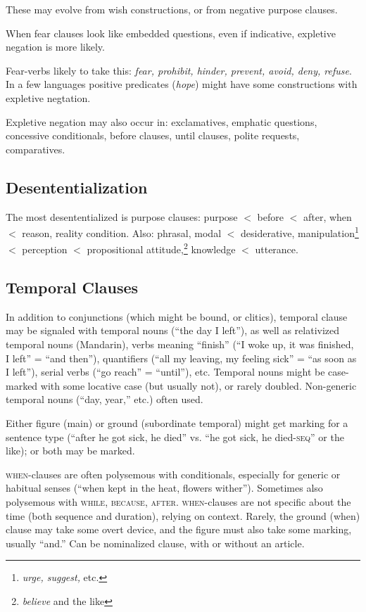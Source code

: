 \documentclass[11pt]{article}
\newcommand{\E}[1]{\textit{#1}}   %
\newcommand{\I}[1]{\textsc{#1}}   %
\begin{document}
These may evolve from wish constructions, or from negative
purpose clauses.

When fear clauses look like embedded questions, even if indicative,
expletive negation is more likely.

Fear-verbs likely to take this: \E{fear, prohibit, hinder, prevent,
  avoid, deny, refuse}.  In a few languages positive predicates
(\E{hope}) might have some constructions with expletive negtation.

Expletive negation may also occur in: exclamatives, emphatic
questions, concessive conditionals, before clauses, until clauses,
polite requests, comparatives.


\subsection{Desententialization}
The most desententialized is purpose clauses: purpose $<$ before $<$
after, when $<$ reason, reality condition.  Also: phrasal, modal $<$
desiderative, manipulation\footnote{\textit{urge, suggest,} etc.} $<$
perception $<$ propositional attitude,\footnote{\textit{believe} and
the like} knowledge $<$ utterance.


\subsection{Temporal Clauses}
In addition to conjunctions (which might be bound, or clitics),
temporal clause may be signaled with temporal nouns (``the day I
left''), as well as relativized temporal nouns (Mandarin), verbs
meaning ``finish'' (``I woke up, it was finished, I left'' = ``and
then''), quantifiers (``all my leaving, my feeling sick'' = ``as soon
as I left''), serial verbs (``go reach'' = ``until''), etc.  Temporal
nouns might be case-marked with some locative case (but usually not),
or rarely doubled.  Non-generic temporal nouns (``day, year,'' etc.)
often used.

Either figure (main) or ground (subordinate temporal) might get
marking for a sentence type (``after he got sick, he died'' vs. ``he
got sick, he died-\I{seq}'' or the like); or both may be marked.

\I{when}-clauses are often polysemous with conditionals, especially
for generic or habitual senses (``when kept in the heat, flowers
wither'').  Sometimes also polysemous with \I{while, because, after}.
\I{when}-clauses are not specific about the time (both sequence and
duration), relying on context.  Rarely, the ground (when) clause may
take some overt device, and the figure must also take some marking,
usually ``and.''  Can be nominalized clause, with or without an
article. 
\end{document}
